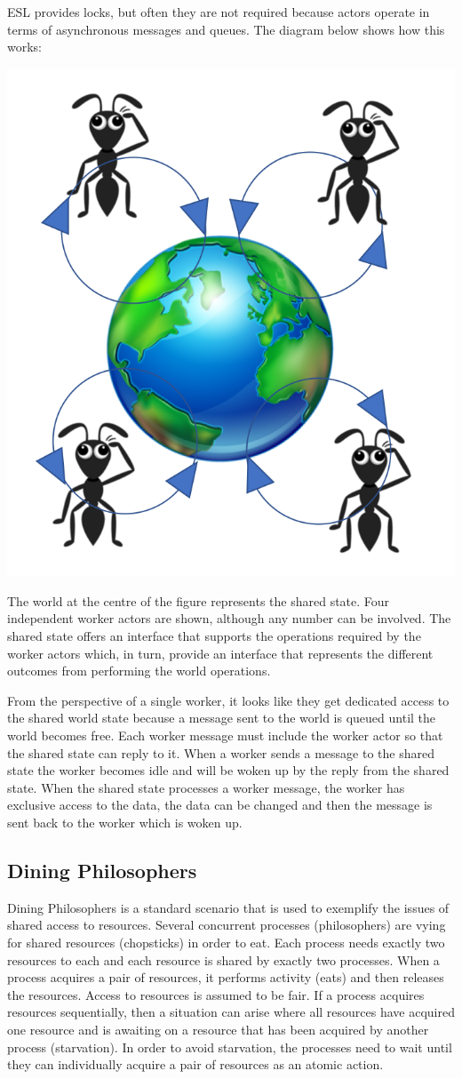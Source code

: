 \documentclass[5p,times]{elsarticle}
\begin{document}
ESL provides locks, but often they are not required because actors operate in terms of asynchronous messages and queues. The diagram below shows how this works:
\begin{center}
\includegraphics[width=0.5\columnwidth]{termites}
\end{center} 
The world at the centre of the figure represents the shared state. Four independent worker actors are shown, although any number can be involved. The shared state offers an interface that supports the operations required by the worker actors which, in turn, provide an interface that represents the different outcomes from performing the world operations.

From the perspective of a single worker, it looks like they get dedicated access to the shared world state because a message sent to the world is queued until the world becomes free. Each worker message must include the worker actor so that the shared state can reply to it. When a worker sends a message to the shared state the worker becomes idle and will be woken up by the reply from the shared state. When the shared state processes a worker message, the worker has exclusive access to the data, the data can be changed and then the message is sent back to the worker which is woken up.

\subsection{Dining Philosophers}

\label{sec:dining_philosophers}

Dining Philosophers is a standard scenario that is used to exemplify the issues of shared access to resources. Several concurrent processes (philosophers) are vying for shared resources (chopsticks) in order to eat. Each process needs exactly two resources to each and each resource is shared by exactly two processes. When a process acquires a pair of resources, it performs activity (eats) and then releases the resources. Access to resources is assumed to be fair. If a process acquires resources sequentially, then a situation can arise where all resources have acquired one resource and is awaiting on a resource that has been acquired by another process (starvation). In order to avoid starvation, the processes need to wait until they can individually acquire a pair of resources as an atomic action.
\end{document}
